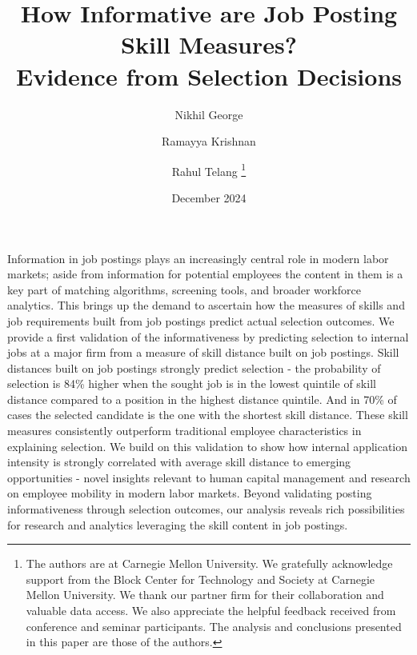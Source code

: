 \documentclass[letterpaper,11pt,leqno]{article}
\newcommand{\bib}{references.bib}
\begin{document}
\title{How Informative are Job Posting Skill Measures? \\ Evidence from Selection Decisions}
\author{%
 Nikhil George \and Ramayya Krishnan \and Rahul Telang%
 \thanks{The authors are at Carnegie Mellon University. We gratefully acknowledge support from the Block Center for Technology and Society at Carnegie Mellon University. We thank our partner firm for their collaboration and valuable data access. We also appreciate the helpful feedback received from conference and seminar participants. The analysis and conclusions presented in this paper are those of the authors.}%
}
\date{December 2024}

\begin{titlepage}
\maketitle

Information in job postings plays an increasingly central role in modern labor markets; aside from information for 
potential employees the content in them is a key part of matching algorithms, screening tools, and broader workforce 
analytics. This brings up the demand to ascertain how the measures of skills and job requirements built from job postings 
predict actual selection outcomes. We provide a first validation of the informativeness by predicting selection to internal 
jobs at a major firm from a measure of skill distance built on job postings. Skill distances built on job postings 
strongly predict selection - the probability of selection is 84\% higher when the sought job is in the lowest quintile 
of skill distance compared to a position in the highest distance quintile. And in 70\% of cases the selected candidate 
is the one with the shortest skill distance. These skill measures consistently outperform traditional employee 
characteristics in explaining selection. We build on this validation to show how internal application intensity is 
strongly correlated with average skill distance to emerging opportunities - novel insights relevant to human capital 
management and research on employee mobility in modern labor markets. Beyond validating posting informativeness through 
selection outcomes, our analysis reveals rich possibilities for research and analytics leveraging the skill content 
in job postings.

\end{titlepage}











\appendix

\end{document}
